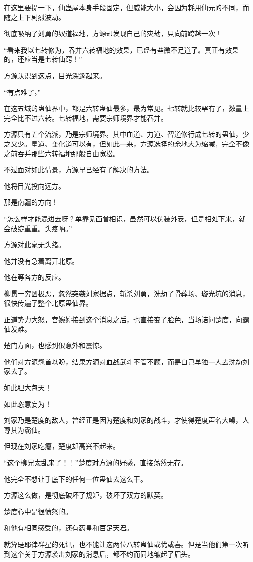 \begin{this_body}
在这里要提一下，仙蛊屋本身手段固定，但威能大小，会因为耗用仙元的不同，而随之上下剧烈波动。

彻底吸纳了刘勇的奴道福地，方源却发现自己的灾劫，只向前跨越一次！

“看来我以七转修为，吞并六转福地的效果，已经有些微不足道了。真正有效果的，还应当是七转仙窍！”

方源认识到这点，目光深邃起来。

“有点难了。”

在这五域的蛊仙界中，都是六转蛊仙最多，最为常见。七转就比较罕有了，数量上完全比不过六转。七转福地，需要宗师境界才能吞并。

方源只有五个流派，乃是宗师境界。其中血道、力道、智道修行成七转的蛊仙，少之又少。星道、变化道可以有，但如此一来，方源选择的余地大为缩减，完全不像之前吞并那些六转福地那般自由宽松。

不过面对如此情景，方源早已经有了解决的方法。

他将目光投向远方。

那是南疆的方向！

“怎么样才能混进去呀？单靠见面曾相识，虽然可以伪装外表，但是相处下来，就会破绽重重。头疼呐。”

方源对此毫无头绪。

他并没有急着离开北原。

他在等各方的反应。

柳贯一穷凶极恶，忽然突袭刘家据点，斩杀刘勇，洗劫了骨葬场、璇光坑的消息，很快传遍了整个北原蛊仙界。

正道势力大怒，宫婉婷接到这个消息之后，也直接变了脸色，当场诘问楚度，向霸仙发难。

楚门方面，也感到很意外和震惊。

他们对方源翘首以盼，结果方源对血战武斗不管不顾，而是自己单独一人去洗劫刘家去了。

如此胆大包天！

如此恣意妄为！

刘家乃是楚度的敌人，曾经正是因为楚度和刘家的战斗，才使得楚度声名大噪，人尊其为霸仙。

但现在刘家吃瘪，楚度却高兴不起来。

“这个柳兄太乱来了！！”楚度对方源的好感，直接荡然无存。

他完全不想让手底下的任何一位蛊仙去这么干。

方源这么做，是彻底破坏了规矩，破坏了双方的默契。

楚度心中是很愤怒的。

和他有相同感受的，还有药皇和百足天君。

就算是耶律群星的死讯，也不能让这两位八转蛊仙或忧或喜。但是当他们第一次听到这个关于方源袭击刘家的消息后，都不约而同地皱起了眉头。


\end{this_body}
